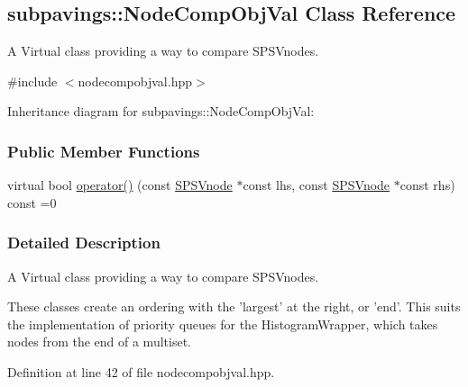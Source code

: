 \hypertarget{classsubpavings_1_1NodeCompObjVal}{\subsection{subpavings\-:\-:\-Node\-Comp\-Obj\-Val \-Class \-Reference}
\label{classsubpavings_1_1NodeCompObjVal}
}


\-A \-Virtual class providing a way to compare \-S\-P\-S\-Vnodes.  




{\ttfamily \#include $<$nodecompobjval.\-hpp$>$}



\-Inheritance diagram for subpavings\-:\-:\-Node\-Comp\-Obj\-Val\-:
\subsubsection*{\-Public \-Member \-Functions}
\begin{DoxyCompactItemize}
\item 
virtual bool \hyperlink{classsubpavings_1_1NodeCompObjVal_a0c12ddc23446e5be6bb71d024ec40c62}{operator()} (const \hyperlink{classsubpavings_1_1SPSVnode}{\-S\-P\-S\-Vnode} $\ast$const lhs, const \hyperlink{classsubpavings_1_1SPSVnode}{\-S\-P\-S\-Vnode} $\ast$const rhs) const =0
\end{DoxyCompactItemize}


\subsubsection{\-Detailed \-Description}
\-A \-Virtual class providing a way to compare \-S\-P\-S\-Vnodes. 

\-These classes create an ordering with the 'largest' at the right, or 'end'. \-This suits the implementation of priority queues for the \-Histogram\-Wrapper, which takes nodes from the end of a multiset. 

\-Definition at line 42 of file nodecompobjval.\-hpp.



